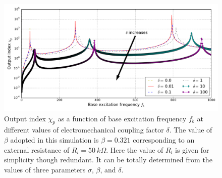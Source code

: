 \documentclass{svjour3}                     %
\begin{document}
\begin{figure}[!htbp]
    \centering
    \includegraphics[width=\textwidth]{./img_eig_asy/fig_sol_analytic_out_index_vs_fr}
    \caption{Output index $\chi_p$ as a function of base excitation frequency $f_b$ at different values of electromechanical coupling factor $\delta$. The value of $\beta$ adopted in this simulation is $\beta = 0.321$ corresponding to an external resistance of $R_l = 50\ k\Omega$. Here the value of $R_l$ is given for simplicity though redundant. It can be totally determined from the values of three parameters $\sigma$, $\beta$, and $\delta$. }
    \label{fig:fig_sol_analytic_out_index_vs_fr}
\end{figure}
\end{document}
